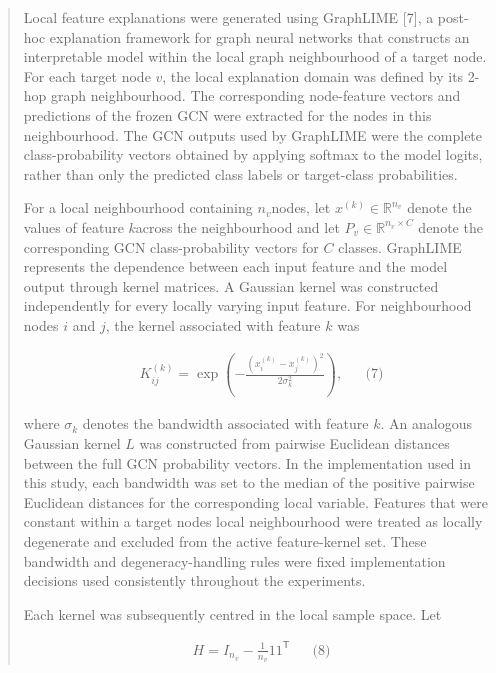 \documentclass[a4paper]{article}
\begin{document}
\begin{quote}
Local feature explanations were generated using GraphLIME {[}7{]}, a
post-hoc explanation framework for graph neural networks that constructs
an interpretable model within the local graph neighbourhood of a target
node. For each target node \(v\), the local explanation domain was
defined by its 2-hop graph neighbourhood. The corresponding node-feature
vectors and predictions of the frozen GCN were extracted for the nodes
in this neighbourhood. The GCN outputs used by GraphLIME were the
complete class-probability vectors obtained by applying softmax to the
model logits, rather than only the predicted class labels or
target-class probabilities.

For a local neighbourhood containing \(n_{v}\)nodes, let
\(x^{(k)} \in \mathbb{R}^{n_{v}}\) denote the values of feature
\(k\)across the neighbourhood and let
\(P_{v} \in \mathbb{R}^{n_{v} \times C}\) denote the corresponding GCN
class-probability vectors for \(C\) classes. GraphLIME represents the
dependence between each input feature and the model output through
kernel matrices. A Gaussian kernel was constructed independently for
every locally varying input feature. For neighbourhood nodes \(i\) and
\(j\), the kernel associated with feature \(k\) was

\[\begin{matrix}
 & K_{ij}^{(k)} = \exp\left( - \frac{\left( x_{i}^{(k)} - x_{j}^{(k)} \right)^{2}}{2\sigma_{k}^{2}} \right), & & \text{(7)}
\end{matrix}
\]

where \(\sigma_{k}\) denotes the bandwidth associated with feature
\(k\). An analogous Gaussian kernel \(L\) was constructed from pairwise
Euclidean distances between the full GCN probability vectors. In the
implementation used in this study, each bandwidth was set to the median
of the positive pairwise Euclidean distances for the corresponding local
variable. Features that were constant within a target
node\textquotesingle s local neighbourhood were treated as locally
degenerate and excluded from the active feature-kernel set. These
bandwidth and degeneracy-handling rules were fixed implementation
decisions used consistently throughout the experiments.

Each kernel was subsequently centred in the local sample space. Let

\[\begin{matrix}
 & H = I_{n_{v}} - \frac{1}{n_{v}}11^{\mathsf{T}} & & \text{(8)}
\end{matrix}
\]


\end{quote}
\end{document}
